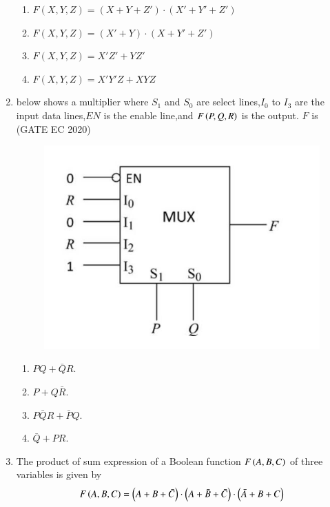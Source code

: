 \begin{enumerate}[label=\arabic*.,ref=\theenumi]
\begin{enumerate}
    \item $F(X, Y, Z) = (X + Y + Z') \cdot (X' + Y' + Z')$
    \item $F(X, Y, Z) = (X'+ Y) \cdot (X + Y' + Z')$
    \item $F(X, Y, Z) = X'Z' + YZ'$
    \item $F(X, Y, Z) = X'Y'Z + XYZ$
\end{enumerate}
\item 
below shows a multiplier where $S_{1}$ and $S_{0}$ are select lines,$I_{0}$ to $I_{3}$ are the input data lines,$EN$ is the enable line,and $F\left(P,Q,R\right)$ is the output. $F$ is 
		\hfill(GATE EC 2020)
    \begin{figure}[!ht]
             \centering
	     \includegraphics[width=\columnwidth]{ide/kmap/figs/muxx.jpg}
	     \caption{}
	     \label{fig:GATE EC 2020}
     \end{figure}
		\begin{enumerate}[label=(\Alph*)]
			\item $PQ+\bar{Q}R$.
			\item $P+Q\bar{R}$.
		        \item $P\bar{Q}R+\bar{P}Q$.
			\item $\bar{Q}+PR$.
		\end{enumerate}
\item The product of sum expression of a Boolean function $F\left(A,B,C\right)$ of three variables is given by
\begin{multline}
F\brak{A,B,C} = \brak{A + B + \bar{C}}\cdot\brak{A + \bar{B} +\bar{C}}\cdot\brak{\bar{A} + B + C}

\end{multline}
\end{enumerate}
